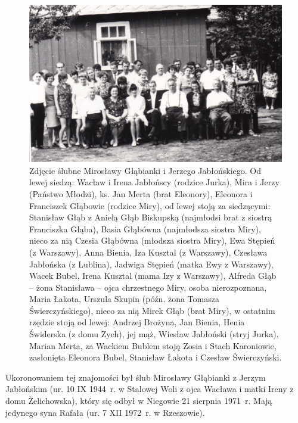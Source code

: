 \begin{figure}
\begin{center}
\includegraphics[width=\textwidth]{zdjecia/slub_jerzego_i_miroslawy_jablonskich_zbiorowe.jpg}
\caption[Zbiorowe zdjęcie ślubne Mirosławy i Jerzego Jabłońskich]{Zdjęcie ślubne Mirosławy Głąbianki i Jerzego Jabłońskiego. Od lewej siedzą: Wacław i Irena Jabłońscy (rodzice Jurka), Mira i Jerzy (Państwo Młodzi), ks. Jan Merta (brat Eleonory), Eleonora i Franciszek Głąbowie (rodzice Miry), od lewej stoją za siedzącymi: Stanisław Głąb z Anielą Głąb Biskupską (najmłodsi brat z siostrą Franciszka Głąba), Basia Głąbówna (najmłodsza siostra Miry), nieco za nią Czesia Głąbówna (młodsza siostra Miry), Ewa Stępień (z Warszawy), Anna Bienia, Iza Kusztal (z Warszawy), Czesława Jabłońska (z Lublina), Jadwiga Stępień (matka Ewy z Warszawy), Wacek Bubel, Irena Kusztal (mama Izy z Warszawy), Alfreda Głąb -- żona Stanisława -- ojca chrzestnego Miry, osoba nierozpoznana, Maria Łakota, Urszula Skupin (późn. żona Tomasza Świerczyńskiego), nieco za nią Mirek Głąb (brat Miry), w ostatnim rzędzie stoją od lewej: Andrzej Brożyna, Jan Bienia, Henia Świderska (z domu Zych), jej mąż, Wiesław Jabłoński (stryj Jurka), Marian Merta, za Wackiem Bublem stoją Zosia i Stach Karoniowie, zasłonięta Eleonora Bubel, Stanisław Łakota i Czesław Świerczyński.}
\label{rys:slub_jerzego_i_miroslawy_jablonskich_zbiorowe}
\end{center}
\end{figure}

Ukoronowaniem tej znajomości był ślub Mirosławy Głąbianki z Jerzym Jabłońskim (ur. 10 IX 1944~r. w Stalowej Woli z ojca Wacława i matki Ireny z domu Żelichowska), który się odbył w Niegowie 21 sierpnia 1971~r. Mają jedynego syna Rafała (ur. 7 XII 1972~r. w Rzeszowie).

